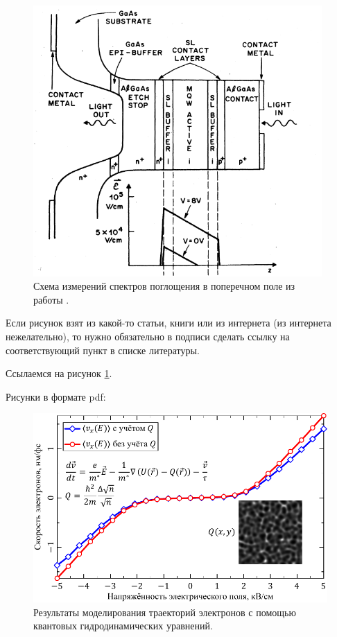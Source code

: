 \documentclass[14pt,oneside]{extarticle}
\begin{document}
\begin{figure}
\begin{center}
    \includegraphics[width=11cm]{images/Miller2-Figure2.png}
    \caption{\label{fig:miller2-2}
        Схема измерений спектров поглощения в поперечном поле из работы \cite{miller1}.}
\end{center}
\end{figure}
    
Если рисунок взят из какой-то статьи, книги или из интернета (из интернета нежелательно), то нужно обязательно в подписи сделать ссылку на соответствующий пункт в списке литературы.

Ссылаемся на рисунок \ref{fig:miller2-2}.

Рисунки в формате pdf:

\begin{figure}
    \begin{center}
        \includegraphics{images/iv-curve.pdf}
        \caption{\label{fig:iv-curve-1}
            Результаты моделирования траекторий электронов с помощью квантовых гидродинамических уравнений.}
    \end{center}
\end{figure}
\end{document}
